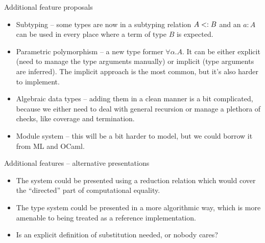 \documentclass{beamer}
\begin{document}
\begin{frame}{Additional feature proposals}

\begin{itemize}
  \item Subtyping -- some types are now in a subtyping relation $A <: B$ and an $a : A$ can be used in every place where a term of type $B$ is expected.
  \item Parametric polymorphism -- a new type former $\forall \alpha. A$. It can be either explicit (need to manage the type arguments manually) or implicit (type arguments are inferred). The implicit approach is the most common, but it's also harder to implement.
  \item Algebraic data types -- adding them in a clean manner is a bit complicated, because we either need to deal with general recursion or manage a plethora of checks, like coverage and termination.
  \item Module system -- this will be a bit harder to model, but we could borrow it from ML and OCaml.
\end{itemize}

\end{frame}

\begin{frame}{Additional features -- alternative presentations}

\begin{itemize}
  \item The system could be presented using a reduction relation which would cover the ``directed'' part of computational equality.
  \item The type system could be presented in a more algorithmic way, which is more amenable to being treated as a reference implementation.
  \item Is an explicit definition of substitution needed, or nobody cares?
\end{itemize}

\end{frame}
\end{document}
